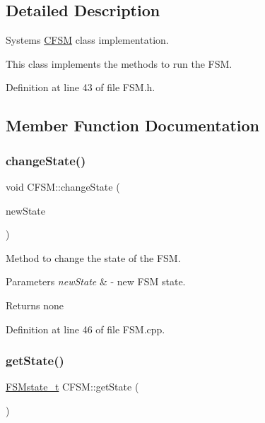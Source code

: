 \subsection{Detailed Description}
System\textquotesingle{}s \mbox{\hyperlink{class_c_f_s_m}{C\+F\+SM}} class implementation. 

This class implements the methods to run the F\+SM. 

Definition at line 43 of file F\+S\+M.\+h.



\subsection{Member Function Documentation}
\mbox{\label{class_c_f_s_m_afce29c93915785baa519eb824efc938b}} 
\subsubsection{\texorpdfstring{change\+State()}{changeState()}}
{\footnotesize\ttfamily void C\+F\+S\+M\+::change\+State (\begin{DoxyParamCaption}\item[{\mbox{\hyperlink{_f_s_m_8h_a7d59fd39d0fd81e92c4d689f0f6e1fab}{F\+S\+Mstate\+\_\+t}}}]{new\+State }\end{DoxyParamCaption})}



Method to change the state of the F\+SM. 


\begin{DoxyParams}{Parameters}
{\em new\+State} & -\/ new F\+SM state. \\
\hline
\end{DoxyParams}
\begin{DoxyReturn}{Returns}
none 
\end{DoxyReturn}


Definition at line 46 of file F\+S\+M.\+cpp.

\mbox{\label{class_c_f_s_m_a596ebe7fc03a0d1402fefc650f6c1777}} 
\subsubsection{\texorpdfstring{get\+State()}{getState()}}
{\footnotesize\ttfamily \mbox{\hyperlink{_f_s_m_8h_a7d59fd39d0fd81e92c4d689f0f6e1fab}{F\+S\+Mstate\+\_\+t}} C\+F\+S\+M\+::get\+State (\begin{DoxyParamCaption}{ }\end{DoxyParamCaption})}



